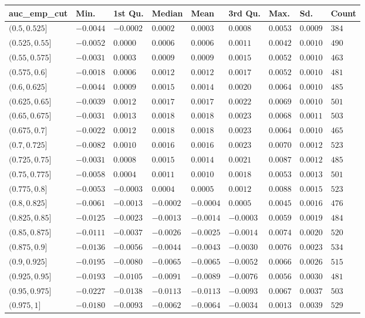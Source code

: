 
\begin{tabular}{l|l|l|l|l|l|l|l|l}
\hline
auc_emp_cut & Min. & 1st Qu. & Median & Mean & 3rd Qu. & Max. & Sd. & Count\\
\hline
$(0.5,0.525]$ & $-0.0044$ & $-0.0002$ & $0.0002$ & $0.0003$ & $0.0008$ & $0.0053$ & $0.0009$ & $384$\\
\hline
$(0.525,0.55]$ & $-0.0052$ & $0.0000$ & $0.0006$ & $0.0006$ & $0.0011$ & $0.0042$ & $0.0010$ & $490$\\
\hline
$(0.55,0.575]$ & $-0.0031$ & $0.0003$ & $0.0009$ & $0.0009$ & $0.0015$ & $0.0052$ & $0.0010$ & $463$\\
\hline
$(0.575,0.6]$ & $-0.0018$ & $0.0006$ & $0.0012$ & $0.0012$ & $0.0017$ & $0.0052$ & $0.0010$ & $481$\\
\hline
$(0.6,0.625]$ & $-0.0044$ & $0.0009$ & $0.0015$ & $0.0014$ & $0.0020$ & $0.0064$ & $0.0010$ & $485$\\
\hline
$(0.625,0.65]$ & $-0.0039$ & $0.0012$ & $0.0017$ & $0.0017$ & $0.0022$ & $0.0069$ & $0.0010$ & $501$\\
\hline
$(0.65,0.675]$ & $-0.0031$ & $0.0013$ & $0.0018$ & $0.0018$ & $0.0023$ & $0.0068$ & $0.0011$ & $503$\\
\hline
$(0.675,0.7]$ & $-0.0022$ & $0.0012$ & $0.0018$ & $0.0018$ & $0.0023$ & $0.0064$ & $0.0010$ & $465$\\
\hline
$(0.7,0.725]$ & $-0.0082$ & $0.0010$ & $0.0016$ & $0.0016$ & $0.0023$ & $0.0070$ & $0.0012$ & $523$\\
\hline
$(0.725,0.75]$ & $-0.0031$ & $0.0008$ & $0.0015$ & $0.0014$ & $0.0021$ & $0.0087$ & $0.0012$ & $485$\\
\hline
$(0.75,0.775]$ & $-0.0058$ & $0.0004$ & $0.0011$ & $0.0010$ & $0.0018$ & $0.0053$ & $0.0013$ & $501$\\
\hline
$(0.775,0.8]$ & $-0.0053$ & $-0.0003$ & $0.0004$ & $0.0005$ & $0.0012$ & $0.0088$ & $0.0015$ & $523$\\
\hline
$(0.8,0.825]$ & $-0.0061$ & $-0.0013$ & $-0.0002$ & $-0.0004$ & $0.0005$ & $0.0045$ & $0.0016$ & $476$\\
\hline
$(0.825,0.85]$ & $-0.0125$ & $-0.0023$ & $-0.0013$ & $-0.0014$ & $-0.0003$ & $0.0059$ & $0.0019$ & $484$\\
\hline
$(0.85,0.875]$ & $-0.0111$ & $-0.0037$ & $-0.0026$ & $-0.0025$ & $-0.0014$ & $0.0074$ & $0.0020$ & $520$\\
\hline
$(0.875,0.9]$ & $-0.0136$ & $-0.0056$ & $-0.0044$ & $-0.0043$ & $-0.0030$ & $0.0076$ & $0.0023$ & $534$\\
\hline
$(0.9,0.925]$ & $-0.0195$ & $-0.0080$ & $\mathbf{-0.0065}$ & $\mathbf{-0.0065}$ & $-0.0052$ & $0.0066$ & $0.0026$ & $515$\\
\hline
$(0.925,0.95]$ & $-0.0193$ & $-0.0105$ & $\mathbf{-0.0091}$ & $\mathbf{-0.0089}$ & $-0.0076$ & $0.0056$ & $0.0030$ & $481$\\
\hline
$(0.95,0.975]$ & $-0.0227$ & $-0.0138$ & $\mathbf{-0.0113}$ & $\mathbf{-0.0113}$ & $-0.0093$ & $0.0067$ & $0.0037$ & $503$\\
\hline
$(0.975,1]$ & $-0.0180$ & $-0.0093$ & $\mathbf{-0.0062}$ & $\mathbf{-0.0064}$ & $-0.0034$ & $0.0013$ & $0.0039$ & $529$\\
\hline
\end{tabular}
